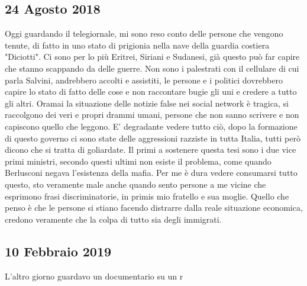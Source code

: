 \subsection{24 Agosto 2018}
Oggi guardando il telegiornale, mi sono reso conto delle persone che vengono tenute, di fatto in uno stato di prigionia nella nave della guardia costiera "Diciotti". Ci sono per lo più Eritrei, Siriani e Sudanesi, già questo può far capire che stanno scappando da delle guerre. Non sono i palestrati con il cellulare di cui parla Salvini, andrebbero accolti e assistiti, le persone e i politici dovrebbero capire lo stato di fatto delle cose e non raccontare bugie gli uni e credere a tutto gli altri. Oramai la situazione delle notizie false nei social network è tragica, si raccolgono dei veri e propri drammi umani, persone che non sanno scrivere e non capiscono quello che leggono.\newline
E' degradante vedere tutto ciò, dopo la formazione di questo governo ci sono state delle aggressioni razziste in tutta Italia, tutti però dicono che si tratta di goliardate. Il primi a sostenere questa tesi sono i due vice primi ministri, secondo questi ultimi non esiste il problema, come quando Berlusconi negava l'esistenza della mafia. Per me è dura vedere consumarsi tutto questo, sto veramente male anche quando sento persone a me vicine che esprimono frasi discriminatorie, in primis mio fratello e sua moglie. Quello che penso è che le persone si stiano facendo distrarre dalla reale situazione economica, credono veramente che la colpa di tutto sia degli immigrati.\newline
\subsection{10 Febbraio 2019}
L'altro giorno guardavo un documentario su un r